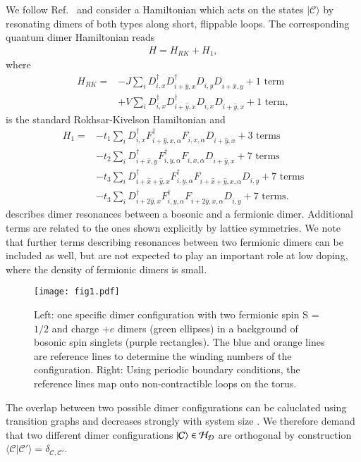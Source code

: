 \documentclass[aps,pra,reprint,showpacs,superscriptaddress]{revtex4-1}
\DeclarePairedDelimiter\ket{\lvert}{\rangle}
\newcommand{\cre}[2]{{#1}^{\dagger}_{#2}}
\newcommand{\ann}[2]{{#1}^{\phantom{\dagger}}_{#2}}
\begin{document}
We follow Ref.~\cite{punk2015quantum} and consider a Hamiltonian which acts on the states $|\mathcal{C}\rangle$ by resonating dimers of both types along short, flippable loops. The corresponding quantum dimer Hamiltonian reads
\begin{align}
H=H_{RK}+H_{1},\label{HAM}
\end{align}
where 
\begin{align}
H_{RK}=&-J\sum_{i}\cre{D}{i,x}\cre{D}{i+\hat{y},x}\ann{D}{i,y}\ann{D}{i+\hat{x},y} + \text{1 term}\\
&+V\sum_{i}\cre{D}{i,x}\cre{D}{i+\hat{y},x}\ann{D}{i,x}\ann{D}{i+\hat{y},x}  + \text{1 term},\nonumber
\end{align}
is the standard Rokhsar-Kivelson Hamiltonian \cite{rokhsar1988superconductivity} and
\begin{align}
H_{1}=&-t_{1} \sum_{i} \cre{D}{i,x}\cre{F}{i+\hat{y},x,\alpha}\ann{F}{i,x,\alpha}\ann{D}{i+\hat{y},x} + \text{3 terms}\\
&-t_{2}\sum_{i}\cre{D}{i+\hat{x},y}\cre{F}{i,y,\alpha}\ann{F}{i,x,\alpha}\ann{D}{i+\hat{y},x} + \text{7 terms}\nonumber\\
&-t_{3}\sum_{i}\cre{D}{i+\hat{x}+\hat{y},x}\cre{F}{i,y,\alpha}\ann{F}{i+\hat{x}+\hat{y},x,\alpha}\ann{D}{i,y} + \text{7 terms}\nonumber\\
&-t_{3}\sum_{i}\cre{D}{i+2\hat{y},x}\cre{F}{i,y,\alpha}\ann{F}{i+2\hat{y},x,\alpha}\ann{D}{i,y} + \text{7 terms}.\nonumber
\end{align}
describes dimer resonances between a bosonic and a fermionic dimer. Additional terms are related to the ones shown explicitly by lattice symmetries. We note that further terms describing resonances between two fermionic dimers can be included as well, but are not expected to play an important role at low doping, where the density of fermionic dimers is small.

\begin{figure}
\centering
 \texttt{[image: fig1.pdf]}
 \caption{Left: one specific dimer configuration with two fermionic spin S = $1/2$ and charge $+e$ dimers (green ellipses) in a background of bosonic spin singlets (purple rectangles). The blue and orange lines are reference lines to determine the winding numbers of the configuration. Right: Using periodic boundary conditions, the reference lines map onto non-contractible loops on the torus.}
\label{FDimer}
\end{figure}

The overlap between two possible dimer configurations can be caluclated using transition graphs and decreases strongly with system size \cite{sutherland1988systems,rokhsar1988superconductivity}. We therefore demand that two different dimer configurations $\ket{\mathcal{C}} \in \mathcal{H_D}$ are orthogonal by construction $\langle \mathcal{C} | \mathcal{C'} \rangle=\delta_{\mathcal{C},\mathcal{C'}}$.
\end{document}
